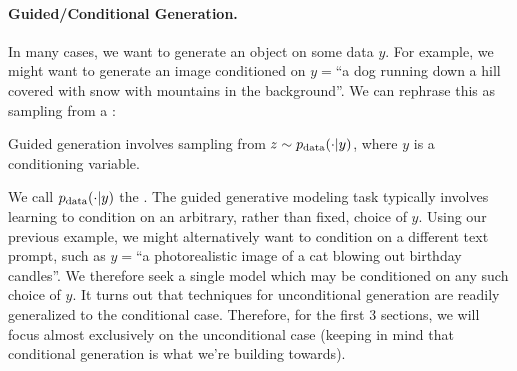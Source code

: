\paragraph{Guided/Conditional Generation.} In many cases, we want to generate an object  on some data $y$. For example, we might want to generate an image conditioned on $y=$``a dog running down a hill covered with snow with mountains in the background''. We can rephrase this as sampling from a :
\begin{ideabox}
Guided generation involves sampling from $z\sim p_{\rm{data}}(\cdot | y)$, where $y$ is a conditioning variable.
\end{ideabox}
We call $p_{\rm{data}}(\cdot|y)$ the . The guided generative modeling task typically involves learning to condition on an arbitrary, rather than fixed, choice of $y$. Using our previous example, we might alternatively want to condition on a different text prompt, such as $y=$``a photorealistic image of a cat blowing out birthday candles''. We therefore seek a single model which may be conditioned on any such choice of $y$. It turns out that techniques for unconditional generation are readily generalized to the conditional case. Therefore, for the first 3 sections, we will focus almost exclusively on the unconditional case (keeping in mind that conditional generation is what we're building towards).



